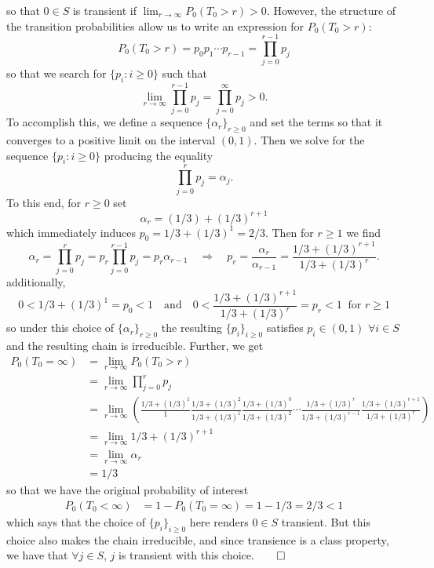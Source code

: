 \documentclass[11pt, letterpaper]{article}
\begin{document}
    so that $0\in S$ is transient if $\lim_{r\rightarrow\infty}P_0(T_0>r)>0$. However, the structure of the transition probabilities allow us to write an expression for $P_0(T_0>r)$:
    \[P_0(T_0>r)=p_0p_1\cdots p_{r-1}=\prod_{j=0}^{r-1}p_j\]
    so that we search for $\{p_i:i\geq 0\}$ such that
    \[\lim_{r\rightarrow\infty}\prod_{j=0}^{r-1}p_j=\prod_{j=0}^{\infty}p_j>0.\]
    To accomplish this, we define a sequence $\{\alpha_r\}_{r\geq 0}$ and set the terms so that it converges to a positive limit on the interval $(0,1)$. Then we solve for the sequence $\{p_i:i\geq 0\}$ producing the equality
    \[\prod_{j=0}^rp_j=\alpha_j.\]
    To this end, for $r\geq 0$ set
    \[\alpha_r=(1/3)+(1/3)^{r+1}\]
    which immediately induces $p_0=1/3+(1/3)^1=2/3$. Then for $r\geq 1$ we find
    \[\alpha_r=\prod_{j=0}^rp_j=p_r\prod_{j=0}^{r-1}p_j=p_r\alpha_{r-1}\quad\Rightarrow\quad p_r=\frac{\alpha_r}{\alpha_{r-1}}=\frac{1/3+(1/3)^{r+1}}{1/3+(1/3)^{r}}.\]
    additionally,
    \[0<1/3+(1/3)^1=p_0<1\quad\text{and}\quad 0<\frac{1/3+(1/3)^{r+1}}{1/3+(1/3)^r}=p_r<1\;\;\text{for $r\geq 1$}\]
    so under this choice of $\{\alpha_r\}_{r\geq 0}$ the resulting $\{p_i\}_{i\geq 0}$ satisfies $p_i\in(0,1)$ $\forall i\in S$ and the resulting chain is irreducible. Further, we get
    \begin{align*}
        P_0(T_0=\infty)&=\lim_{r\rightarrow\infty}P_0(T_0>r)\\
        &=\lim_{r\rightarrow\infty}\prod_{j=0}^rp_j\\
        &=\lim_{r\rightarrow\infty}\left(\frac{1/3+(1/3)^1}{1}\frac{1/3+(1/3)^2}{1/3+(1/3)^1}\frac{1/3+(1/3)^3}{1/3+(1/3)^2}\cdots\frac{1/3+(1/3)^r}{1/3+(1/3)^{r-1}}\frac{1/3+(1/3)^{r+1}}{1/3+(1/3)^r}\right)\\
        &=\lim_{r\rightarrow\infty}1/3+(1/3)^{r+1}\\
        &=\lim_{r\rightarrow\infty}\alpha_r\tag{$\ast$}\\
        &=1/3
    \end{align*}
    so that we have the original probability of interest
    \begin{align*}
        P_0(T_0<\infty)&=1-P_0(T_0=\infty)
        =1-1/3
        =2/3
        <1
    \end{align*}
    which says that the choice of $\{p_i\}_{i\geq 0}$ here renders $0\in S$ transient. But this choice also makes the chain irreducible, and since transience is a class property, we have that $\forall j\in S$, $j$ is transient with this choice.\hfill{$\qed$}\\[10pt]
\end{document}
